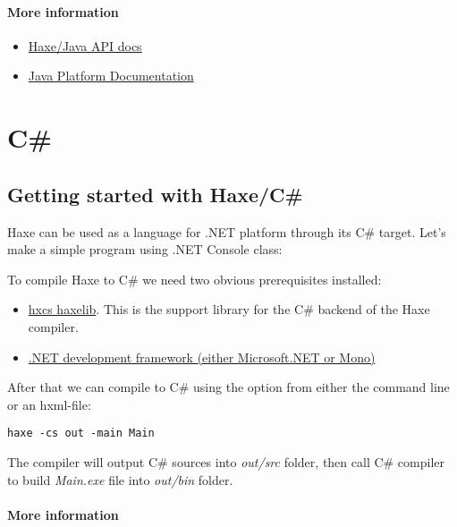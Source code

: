 \paragraph{More information}

\begin{itemize}
	\item \href{http://api.haxe.org/java/}{Haxe/Java API docs}
	\item \href{https://docs.oracle.com/javase/}{Java Platform Documentation}
\end{itemize}


\section{C\#}
\label{target-cs}

\subsection{Getting started with Haxe/C#}
\label{target-cs-getting-started}

Haxe can be used as a language for .NET platform through its C# target. Let's make a simple program using .NET Console class:


To compile Haxe to C# we need two obvious prerequisites installed:

\begin{itemize}
	\item \href{http://lib.haxe.org/p/hxcs}{hxcs haxelib}. This is the support library for the C# backend of the Haxe compiler.
	\item \href{https://www.microsoft.com/net}{.NET development framework (either Microsoft.NET or Mono)}
\end{itemize}

After that we can compile to C# using the  option from either the command line or an hxml-file:

\begin{lstlisting}
haxe -cs out -main Main
\end{lstlisting}

The compiler will output C# sources into  \emph{out/src} folder, then call C# compiler to build  \emph{Main.exe} file into  \emph{out/bin} folder.

\paragraph{More information}

